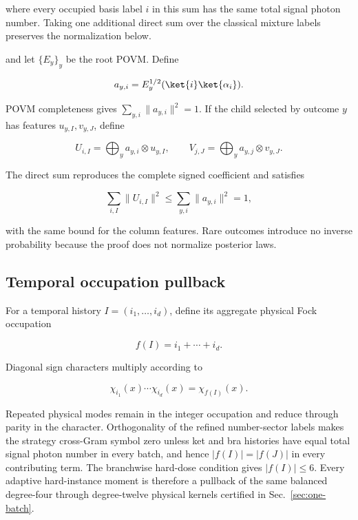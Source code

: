 where every occupied basis label $i$ in this sum has the same total signal photon number. Taking one additional direct sum over the classical mixture labels preserves the normalization below.

and let $\{E_y\}_y$ be the root POVM. Define

\begin{equation}
a_{y,i}=E_y^{1/2}(\ket{i}\ket{\alpha_i}).
\end{equation}

POVM completeness gives $\sum_{y,i}\|a_{y,i}\|^2=1$. If the child selected by outcome $y$ has features $u_{y,I},v_{y,J}$, define

\begin{equation}
U_{i,I}=\bigoplus_y a_{y,i}\otimes u_{y,I},
\qquad
V_{j,J}=\bigoplus_y a_{y,j}\otimes v_{y,J}.
\label{eq:adaptive-direct-sum}
\end{equation}

The direct sum reproduces the complete signed coefficient and satisfies

\begin{equation}
\sum_{i,I}\|U_{i,I}\|^2
\le\sum_{y,i}\|a_{y,i}\|^2=1,
\end{equation}

with the same bound for the column features. Rare outcomes introduce no inverse probability because the proof does not normalize posterior laws.

\subsection{Temporal occupation pullback}

For a temporal history $I=(i_1,\ldots,i_d)$, define its aggregate physical Fock occupation

\begin{equation}
f(I)=i_1+\cdots+i_d.
\end{equation}

Diagonal sign characters multiply according to

\begin{equation}
\chi_{i_1}(x)\cdots\chi_{i_d}(x)=\chi_{f(I)}(x).
\label{eq:adaptive-character}
\end{equation}

Repeated physical modes remain in the integer occupation and reduce through parity in the character. Orthogonality of the refined number-sector labels makes the strategy cross-Gram symbol zero unless ket and bra histories have equal total signal photon number in every batch, and hence $|f(I)|=|f(J)|$ in every contributing term. The branchwise hard-dose condition gives $|f(I)|\le6$. Every adaptive hard-instance moment is therefore a pullback of the same balanced degree-four through degree-twelve physical kernels certified in Sec.~\ref{sec:one-batch}.

